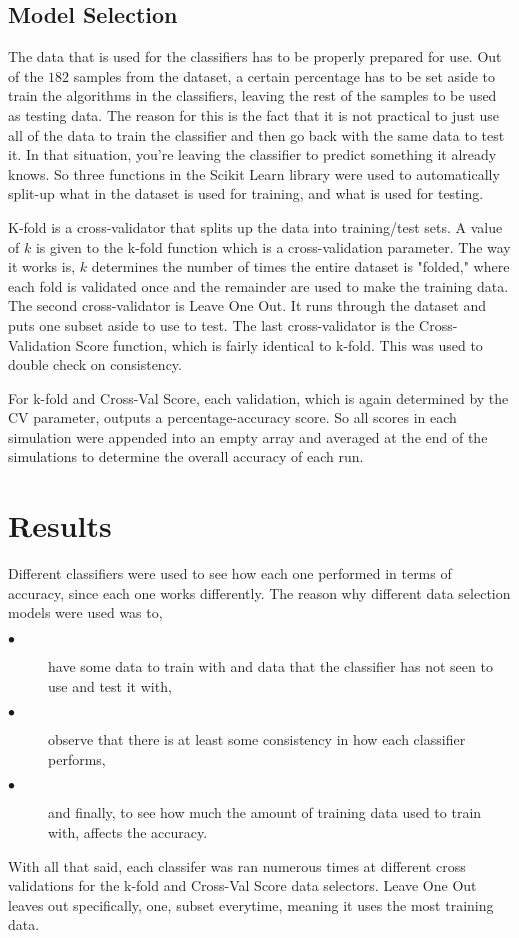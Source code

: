 \documentclass[conference,compsoc]{IEEEtran}
\begin{document}
\subsection{Model Selection}
The data that is used for the classifiers has to be properly prepared for use. Out of the $182$ samples from the dataset, a certain percentage has to be set aside to train the algorithms in the classifiers, leaving the rest of the samples to be used as testing data. The reason for this is the fact that it is not practical to just use all of the data to train the classifier and then go back with the same data to test it. In that situation, you're leaving the classifier to predict something it already knows. 
So three functions in the Scikit Learn library were used to automatically split-up what in the dataset is used for training, and what is used for testing. 

K-fold is a cross-validator that splits up the data into training/test sets. A value of $k$ is given to the k-fold function which is a cross-validation parameter. The way it works is, $k$ determines the number of times the entire dataset is "folded," where each fold is validated once and the remainder are used to make the training data. 
The second cross-validator is Leave One Out. It runs through the dataset and puts one subset aside to use to test. The last cross-validator is the Cross-Validation Score function, which is fairly identical to k-fold. This was used to double check on consistency.

For k-fold and Cross-Val Score, each validation, which is again determined by the CV parameter, outputs a percentage-accuracy score. So all scores in each simulation were appended into an empty array and averaged at the end of the simulations to determine the overall accuracy of each run.

\section{Results}
Different classifiers were used to see how each one performed in terms of accuracy, since each one works differently. The reason why different data selection models 
were used was to,
\begin{description}
	\item[$\bullet$] have some data to train with and data that the classifier has not seen to use and test it with,
	\item[$\bullet$] observe that there is at least some consistency in how each classifier performs,
	\item[$\bullet$] and finally, to see how much the amount of training data used to train with, affects the accuracy.
\end{description}
\noindent With all that said, each classifer was ran numerous times at different cross validations for the k-fold and Cross-Val Score data selectors. Leave One Out leaves out specifically, one, subset everytime, meaning it uses the most training data.
\end{document}
